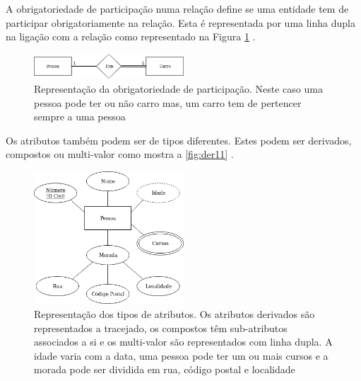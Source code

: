 \documentclass[11pt,twoside,a4paper]{report}
\begin{document}
A obrigatoriedade de participação numa relação define se uma entidade tem de participar obrigatoriamente na relação. Esta é representada por uma linha dupla na ligação com a relação como representado na Figura \ref{fig:der9} \cite{analise_requisitos}. 
\begin{figure}[H]
	\begin{center}
		\includegraphics[width=0.5\textwidth]{notacao13} %
		\caption[Representação da obrigatoriedade de participação]{Representação da obrigatoriedade de participação. Neste caso uma pessoa pode ter ou não carro mas, um carro tem de pertencer sempre a uma pessoa}
		\label{fig:der9}
	\end{center}
\end{figure}
Os atributos também podem ser de tipos diferentes. Estes podem ser derivados, compostos ou multi-valor como mostra a \autoref{fig:der11} \cite{analise_requisitos}.
\begin{figure}[H]
	\begin{center}
		\includegraphics[width=0.5\textwidth]{notacao14} %
		\caption[Representação dos tipos de atributos]{Representação dos tipos de atributos. Os atributos derivados são representados a tracejado, os compostos têm sub-atributos associados a si e os multi-valor são representados com linha dupla. A idade varia com a data, uma pessoa pode ter um ou mais cursos e a morada pode ser dividida em rua, código postal e localidade}
		\label{fig:der11}
	\end{center}
\end{figure}
\end{document}
